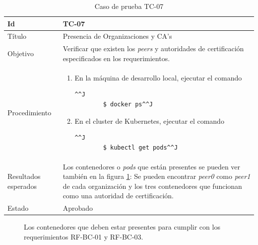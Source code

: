 \lstset{
  frame=none
}
\begin{table}[H]
    \begin{tabularx}{\textwidth}{|m{3cm}|X|}
    \hline
    Id & TC-07\\
    \hline
    Título & Presencia de Organizaciones y CA's\\
    \hline
    Objetivo & Verificar que existen los \textit{peers} y autoridades de certificación especificados en los requerimientos.\\
    \hline
    Procedimiento & \begin{enumerate}
    \item En la máquina de desarrollo local, ejecutar el comando 
    \begin{lstlisting}^^J
        $ docker ps^^J
    \end{lstlisting}
    \item En el cluster de Kubernetes, ejecutar el comando
    \begin{lstlisting}^^J
        $ kubectl get pods^^J
    \end{lstlisting}
    \end{enumerate}\\
    \hline
    Resultados esperados & Los contenedores o \textit{pods} que están presentes se pueden ver también en la figura \ref{fig:all_containers}: Se pueden encontrar \textit{peer0} como \textit{peer1} de cada organización y los tres contenedores que funcionan como una autoridad de certificación.\\
    \hline
    Estado & Aprobado\\
    \hline
    \end{tabularx}
    \caption{Caso de prueba TC-07}
    \end{table}

\begin{figure}[H]
    \caption{Los contenedores que deben estar presentes para cumplir con los requerimientos RF-BC-01 y RF-BC-03. }
    \label{fig:all_containers}
\end{figure}

